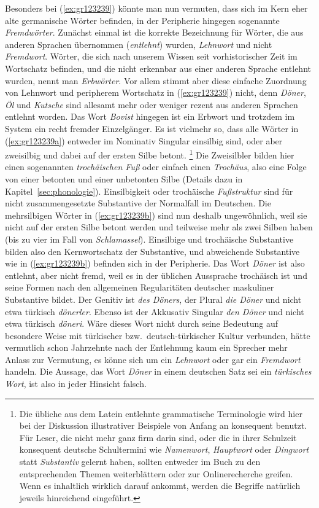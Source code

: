 Besonders bei (\ref{ex:gr123239}) könnte man nun vermuten, dass sich im Kern eher alte germanische Wörter befinden, in der Peripherie hingegen sogenannte \textit{Fremdwörter}.
Zunächst einmal ist die korrekte Bezeichnung für Wörter, die aus anderen Sprachen übernommen (\textit{entlehnt}) wurden, \textit{Lehnwort} und nicht \textit{Fremdwort}.
Wörter, die sich nach unserem Wissen seit vorhistorischer Zeit im Wortschatz befinden, und die nicht erkennbar aus einer anderen Sprache entlehnt wurden, nennt man \textit{Erbwörter}.
Vor allem stimmt aber diese einfache Zuordnung von Lehnwort und peripherem Wortschatz in (\ref{ex:gr123239}) nicht, denn \textit{Döner}, \textit{Öl} und \textit{Kutsche} sind allesamt mehr oder weniger rezent aus anderen Sprachen entlehnt worden.
Das Wort \textit{Bovist} hingegen ist ein Erbwort und trotzdem im System ein recht fremder Einzelgänger.
Es ist vielmehr so, dass alle Wörter in (\ref{ex:gr123239a}) entweder im Nominativ Singular einsilbig sind, oder aber zweisilbig und dabei auf der ersten Silbe betont.%
\footnote{Die übliche aus dem Latein entlehnte grammatische Terminologie wird hier bei der Diskussion illustrativer Beispiele von Anfang an konsequent benutzt.
Für Leser, die nicht mehr ganz firm darin sind, oder die in ihrer Schulzeit konsequent deutsche Schultermini wie \zB \textit{Namenwort}, \textit{Hauptwort} oder \textit{Dingwort} statt \textit{Substantiv} gelernt haben, sollten entweder im Buch zu den entsprechenden Themen weiterblättern oder zur Onlinerecherche greifen.
Wenn es inhaltlich wirklich darauf ankommt, werden die Begriffe natürlich jeweils hinreichend eingeführt.}
Die Zweisilbler bilden hier einen sogenannten \textit{trochäischen Fuß} oder einfach einen \textit{Trochäus}, also eine Folge von einer betonten und einer unbetonten Silbe (Details dazu in Kapitel~\ref{sec:phonologie}).
Einsilbigkeit oder trochäische \textit{Fußstruktur} sind für nicht zusammengesetzte Substantive der Normalfall im Deutschen.
Die mehrsilbigen Wörter in (\ref{ex:gr123239b}) sind nun deshalb ungewöhnlich, weil sie nicht auf der ersten Silbe betont werden und teilweise mehr als zwei Silben haben (bis zu vier im Fall von \textit{Schlamassel}).
Einsilbige und trochäische Substantive bilden also den Kernwortschatz der Substantive, und abweichende Substantive wie in (\ref{ex:gr123239b}) befinden sich in der Peripherie.
Das Wort \textit{Döner} ist also entlehnt, aber nicht fremd, weil es in der üblichen Aussprache trochäisch ist und seine Formen nach den allgemeinen Regularitäten deutscher maskuliner Substantive bildet.
Der Genitiv ist \textit{des Döners}, der Plural \textit{die Döner} und nicht etwa türkisch \textit{dönerler}.
Ebenso ist der Akkusativ Singular \textit{den Döner} und nicht etwa türkisch \textit{döneri}.
Wäre dieses Wort nicht durch seine Bedeutung auf besondere Weise mit türkischer bzw.\ deutsch-türkischer Kultur verbunden, hätte vermutlich schon Jahrzehnte nach der Entlehnung kaum ein Sprecher mehr Anlass zur Vermutung, es könne sich um ein \textit{Lehnwort} oder gar ein \textit{Fremdwort} handeln.
Die Aussage, das Wort \textit{Döner} in einem deutschen Satz sei ein \textit{türkisches Wort}, ist also in jeder Hinsicht falsch.

